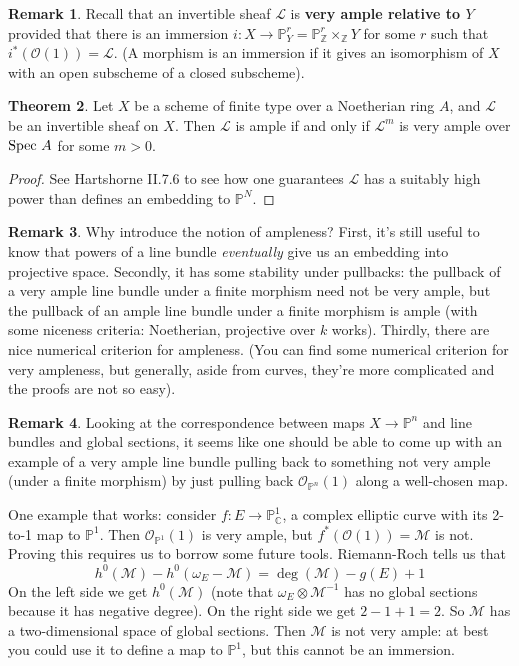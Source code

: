 \documentclass[10pt,reqno]{amsart}
\theoremstyle{definition}
\newtheorem{theorem}{Theorem}
\newtheorem{remark}[theorem]{Remark}
\theoremstyle{remark}
\numberwithin{equation}{section}
\numberwithin{theorem}{section}
\newcommand{\C}{{\mathbb C}}
\newcommand{\Z}{{\mathbb Z}}
\newcommand{\OO}{{\mathcal O}}
\newcommand{\spec}{\textup{Spec }}
\newcommand{\LL}{{\mathscr L}}
\newcommand{\MM}{{\mathscr M}}
\newcommand{\PP}{{\mathbb P}}
\begin{document}
\begin{remark} Recall that an invertible sheaf $\LL$ is \textbf{very ample relative to $Y$} provided that there is an immersion $i: X \to \PP^r_Y = \PP^r_{\Z} \times_{\Z} Y$ for some $r$ such that $i^*(\OO(1)) = \LL$. (A morphism is an immersion if it gives an isomorphism of $X$ with an open subscheme of a closed subscheme).
\end{remark}

\begin{theorem} Let $X$ be a scheme of finite type over a Noetherian ring $A$, and $\LL$ be an invertible sheaf on $X$. Then $\LL$ is ample if and only if $\LL^m$ is very ample over $\spec A$ for some $m > 0$.
\end{theorem}
\begin{proof}
See Hartshorne II.7.6 to see how one guarantees $\LL$ has a suitably high power than defines an embedding to $\PP^N$.
\end{proof}

\begin{remark} Why introduce the notion of ampleness? First, it's still useful to know that powers of a line bundle \textit{eventually} give us an embedding into projective space. Secondly, it has some stability under pullbacks: the pullback of a very ample line bundle under a finite morphism need not be very ample, but the pullback of an ample line bundle under a finite morphism is ample (with some niceness criteria: Noetherian, projective over $k$ works). Thirdly, there are nice numerical criterion for ampleness. (You can find some numerical criterion for very ampleness, but generally, aside from curves, they're more complicated and the proofs are not so easy).
\end{remark}

\begin{remark} Looking at the correspondence between maps $X \to \PP^n$ and line bundles and global sections, it seems like one should be able to come up with an example of a very ample line bundle pulling back to something not very ample (under a finite morphism) by just pulling back $\OO_{\PP^n}(1)$ along a well-chosen map.

One example that works: consider $f: E \to \PP^1_{\C}$, a complex elliptic curve with its 2-to-1 map to $\PP^1$. Then $\OO_{\PP^1}(1)$ is very ample, but $f^*(\OO(1)) = \MM$ is not. Proving this requires us to borrow some future tools. Riemann-Roch tells us that
\[h^0(\MM) - h^0(\omega_E - \MM) = \deg(\MM) - g(E) + 1\]
On the left side we get $h^0(\MM)$ (note that $\omega_E \otimes \MM^{-1}$ has no global sections because it has negative degree). On the right side we get $2-1+1=2$. So $\MM$ has a two-dimensional space of global sections. Then $\MM$ is not very ample: at best you could use it to define a map to $\PP^1$, but this cannot be an immersion.
\end{remark}
\end{document}
